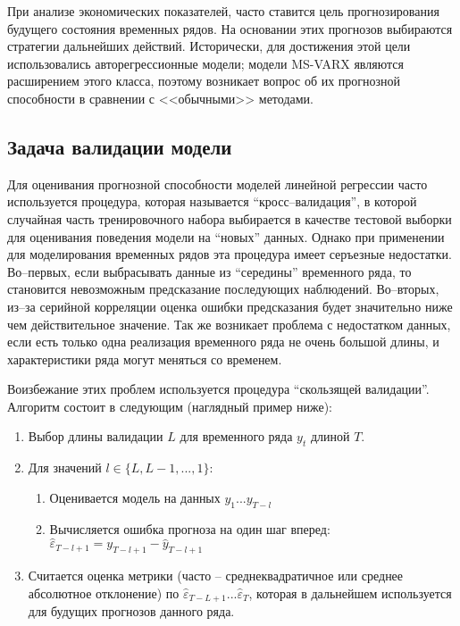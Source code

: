 \documentclass[a4paper,14pt]{extreport}
\begin{document}
	При анализе экономических показателей, часто ставится цель прогнозирования будущего состояния временных рядов. На основании этих прогнозов выбираются стратегии дальнейших действий. Исторически, для достижения этой цели использовались авторегрессионные модели; модели MS-VARX являются расширением этого класса, поэтому возникает вопрос об их прогнозной способности в сравнении с <<обычными>> методами.
	
	\subsection{Задача валидации модели}
	
	Для оценивания прогнозной способности моделей линейной регрессии часто используется процедура, которая называется ``кросс--валидация'', в которой случайная часть тренировочного набора выбирается в качестве тестовой выборки для оценивания поведения модели на ``новых'' данных. Однако при применении для моделирования временных рядов эта процедура имеет серъезные недостатки. Во--первых, если выбрасывать данные из ``середины'' временного ряда, то становится невозможным предсказание последующих наблюдений. Во--вторых, из--за серийной корреляции оценка ошибки предсказания будет значительно ниже чем действительное значение. Так же возникает проблема с недостатком данных, если есть только одна реализация временного ряда не очень большой длины, и характеристики ряда могут меняться со временем.
	
	Воизбежание этих проблем используется процедура ``скользящей валидации''. Алгоритм состоит в следующим (наглядный пример ниже):
	\begin{enumerate}
		\item Выбор длины валидации $L$ для временного ряда  $y_t$ длиной $T$.
		\item Для значений $l \in \{L, L-1, ..., 1\}$:
		\begin{enumerate}
			\item Оценивается модель на данных $y_1 ... y_{T-l}$
			\item Вычисляется ошибка прогноза на один шаг вперед: 
			$\hat{\varepsilon}_{T-l+1} = y_{T-l+1} - \hat{y}_{T-l+1}$
		\end{enumerate}
		\item Считается оценка метрики (часто -- среднеквадратичное или среднее абсолютное отклонение) по $\hat{\varepsilon}_{T-L+1} ... \hat{\varepsilon}_{T}$, которая в дальнейшем используется для будущих прогнозов данного ряда.
	\end{enumerate}
	
\end{document}
